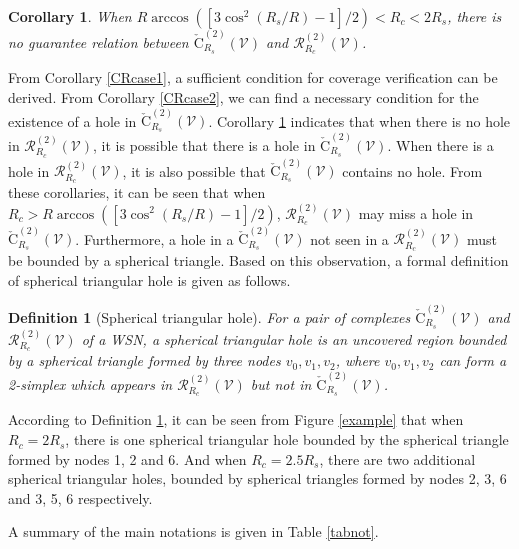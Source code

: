 \documentclass[journal, twoside]{IEEEtran}
\newtheorem{definition}{Definition}
\newtheorem{corollary}{Corollary}
\begin{document}
\begin{corollary} \label{CRcase3}
When $R \arccos ([3\cos^2(R_s/R)-1]/2) < R_c < 2R_s$, there is no guarantee
relation between $\check{\textrm{C}}_{R_s}^{(2)}(\mathcal{V})$ and $\mathcal{R}_{R_c}^{(2)}(\mathcal{V})$.
\end{corollary}

From Corollary \ref{CRcase1}, a sufficient condition for coverage verification
can be derived. From Corollary \ref{CRcase2}, we can find a necessary condition for 
the existence of a hole in $\check{\textrm{C}}_{R_s}^{(2)}(\mathcal{V})$. Corollary
\ref{CRcase3} indicates that when there is no hole in $\mathcal{R}_{R_c}^{(2)}(\mathcal{V})$,
it is possible that there is a hole in $\check{\textrm{C}}_{R_s}^{(2)}(\mathcal{V})$. When there
is a hole in $\mathcal{R}_{R_c}^{(2)}(\mathcal{V})$, it is also possible that $\check{\textrm{C}}_{R_s}^{(2)}(\mathcal{V})$ contains no hole. 
From these corollaries, it can be seen that when $R_c > R \arccos ([3\cos^2(R_s/R)-1]/2)$, 
$\mathcal{R}_{R_c}^{(2)}(\mathcal{V})$ may miss a hole in $\check{\textrm{C}}_{R_s}^{(2)}(\mathcal{V})$.
Furthermore, a hole in a $\check{\textrm{C}}_{R_s}^{(2)}(\mathcal{V})$
not seen in a $\mathcal{R}_{R_c}^{(2)}(\mathcal{V})$ must be bounded by a spherical triangle. 
Based on this observation, a formal definition of spherical triangular hole is given as follows.

\begin{definition}[Spherical triangular hole]\label{trihole}
For a pair of complexes $\check{\textrm{C}}_{R_s}^{(2)}(\mathcal{V})$ and 
$\mathcal{R}_{R_c}^{(2)}(\mathcal{V})$ of a WSN, a spherical triangular hole is an uncovered 
region bounded by a spherical triangle formed by three nodes $v_0, v_1, v_2$, where 
$v_0, v_1, v_2$ can form a 2-simplex which appears in $\mathcal{R}_{R_c}^{(2)}(\mathcal{V})$ 
but not in $\check{\textrm{C}}_{R_s}^{(2)}(\mathcal{V})$.
\end{definition}

According to Definition \ref{trihole}, it can be seen from Figure \ref{example}
that when $R_c = 2R_s$, there is one spherical triangular hole bounded by the spherical
triangle formed by nodes 1, 2 and 6. And when $R_c = 2.5R_s$, there are two additional
spherical triangular holes, bounded by spherical triangles formed by nodes
2, 3, 6 and 3, 5, 6 respectively.

A summary of the main notations is given in Table \ref{tabnot}.
\end{document}
